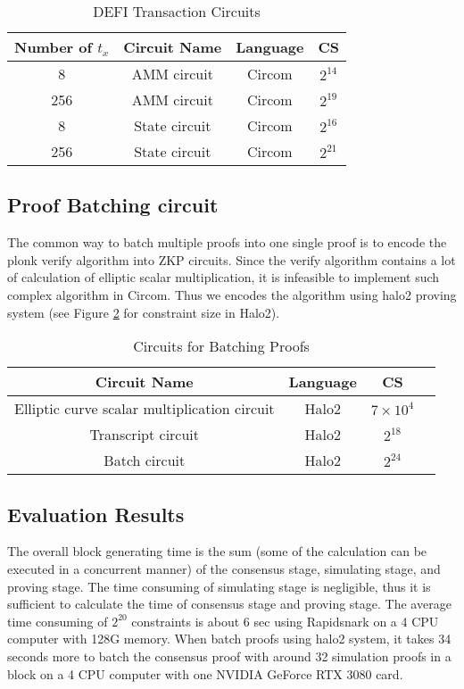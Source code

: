\begin{table}[h]
\small
\centering
\caption{DEFI Transaction Circuits}
\label{tbl:defi-cs}
\begin{tabular}{ | c | c | c | c | }
\hline
Number of $t_x$ & Circuit Name & Language & CS \\
\hline
8 & AMM circuit & Circom & $2^{14}$ \\
\hline
256 & AMM circuit & Circom & $2^{19}$ \\
\hline
8 & State circuit & Circom & $2^{16}$ \\
\hline
256 & State circuit & Circom & $2^{21}$ \\
\hline
\end{tabular}
\end{table}

\subsection{Proof Batching 
circuit}
The common way to batch multiple proofs into one single proof is to encode the plonk verify algorithm into ZKP circuits. Since the verify algorithm contains a lot of calculation of elliptic scalar multiplication, it is infeasible to implement such complex algorithm in Circom. Thus we encodes the algorithm using halo2 proving system (see Figure \ref{tbl:batch-proofs} for constraint size in Halo2).  

\begin{table}[!ht]
\small
\centering
\caption{Circuits for Batching Proofs}
\label{tbl:batch-proofs}
\begin{tabular}{ | c | c | c | c | }
\hline
Circuit Name & Language & CS \\
\hline
Elliptic curve scalar multiplication circuit & Halo2 & $7 \times 10^4$ \\
\hline
Transcript circuit & Halo2 & $2^{18}$ \\
\hline
Batch circuit & Halo2 & $2^{24}$ \\
\hline
\end{tabular}
\end{table}

\subsection{Evaluation Results}
The overall block generating time is the sum (some of the calculation can be executed in a concurrent manner) of the consensus stage, simulating stage, and proving stage. The time consuming of simulating stage is negligible, thus it is sufficient to calculate the time of consensus stage and proving stage. The average time consuming of $2^{20}$ constraints is about 6 sec using Rapidsnark on a 4 CPU computer with 128G memory. When batch proofs using halo2 system, it takes 34 seconds more to batch the consensus proof with around 32 simulation proofs in a block on a 4 CPU computer with one NVIDIA GeForce RTX 3080 card.

